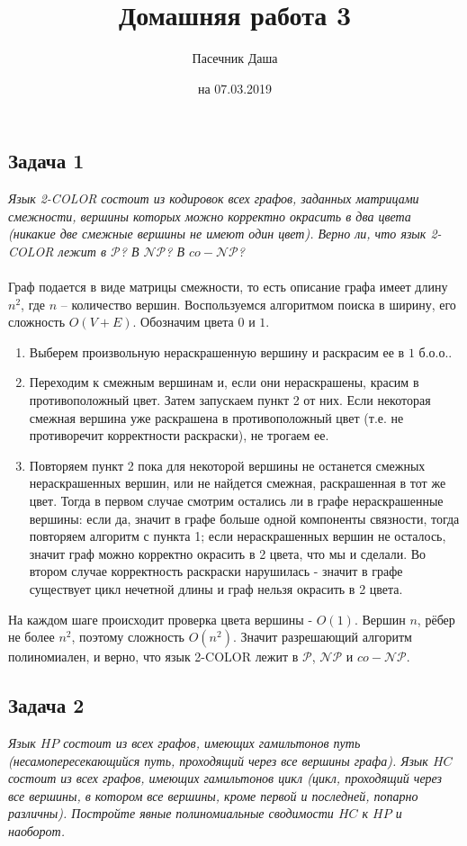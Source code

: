 \documentclass{article}
\title{Домашняя работа 3}
\author{Пасечник Даша}
\date{на 07.03.2019}
\begin{document}
\maketitle

\subsection*{Задача 1}
\textit{ Язык 2-COLOR состоит из кодировок всех графов, заданных матрицами смежности, вершины которых можно корректно окрасить в два цвета (никакие две смежные вершины не имеют один цвет). Верно ли, что язык 2-COLOR лежит в $\mathcal{P}$? В $\mathcal{NP}$? В $co-\mathcal{NP}$?}\\
\\
Граф подается в виде матрицы смежности, то есть описание графа имеет длину $n^2$, где $n$ -- количество вершин. Воспользуемся алгоритмом поиска в ширину, его сложность $O(V + E)$. Обозначим цвета $0$ и $1$. 
\begin{enumerate}
\item Выберем произвольную нераскрашенную вершину и раскрасим ее в $1$ б.о.о.. 
\item Переходим к смежным вершинам и, если они нераскрашены, красим в противоположный цвет. Затем запускаем пункт 2 от них. Если некоторая смежная вершина уже раскрашена в противоположный цвет (т.е. не противоречит корректности раскраски), не трогаем ее.
\item Повторяем пункт 2 пока для некоторой вершины не останется смежных нераскрашенных вершин, или не найдется смежная, раскрашенная в тот же цвет. Тогда в первом случае смотрим остались ли в графе нераскрашенные вершины: если да, значит в графе больше одной компоненты связности, тогда повторяем алгоритм с пункта 1; если нераскрашенных вершин не осталось, значит граф можно корректно окрасить в 2 цвета, что мы и сделали. Во втором случае корректность раскраски нарушилась - значит в графе существует цикл нечетной длины и граф нельзя окрасить в 2 цвета.
\end{enumerate} 
На каждом шаге происходит проверка цвета вершины - $O(1)$. Вершин $n$, рёбер не более $n^2$, поэтому сложность $O(n^2)$. Значит разрешающий алгоритм полиномиален, и верно, что язык 2-COLOR лежит в $\mathcal{P}$, $\mathcal{NP}$ и $co-\mathcal{NP}$.
\subsection*{Задача 2}
\textit{Язык $HP$ состоит из всех графов, имеющих гамильтонов путь (несамопересекающийся путь, проходящий через все вершины графа). Язык $HC$ состоит из всех графов, имеющих гамильтонов цикл (цикл, проходящий через все вершины, в котором все вершины, кроме первой и последней, попарно различны).
Постройте явные полиномиальные сводимости $HC$ к $HP$ и наоборот.}
\end{document}
